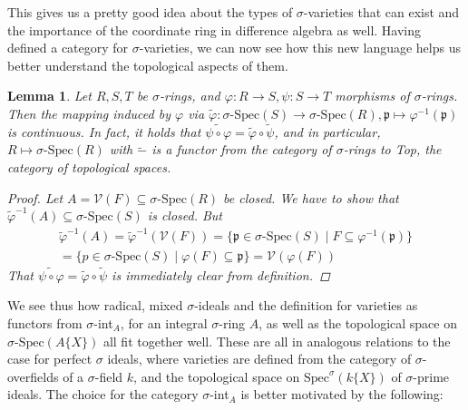 \documentclass{article}
\def\V{\mathcal{V}}
\def\p{\mathfrak{p}}
\def\s{\sigma}
\def\Spec{\text{Spec}}
\def\sSpec{\sigma\text{-Spec}}
\newenvironment{bew}{\begin{proof}[Proof]}{\end{proof}}
\theoremstyle{plain}
\newtheorem{lem}[Satz]{Lemma}
\theoremstyle{definition}
\begin{document}
This gives us a pretty good idea about the types of $\s$-varieties that can exist and the importance of the coordinate ring in difference algebra as well. 
Having defined a category for $\s$-varieties, we can now see how this new language helps us better understand the topological aspects of them.

\begin{lem}\label{inducedcont}
Let $R,S,T$ be $\s$-rings, and $\varphi: R \rightarrow S, \psi: S \rightarrow T$ morphisms of $\s$-rings. Then the mapping induced by $\varphi$ via $\tilde \varphi: \sSpec(S) \rightarrow \sSpec(R), \p \mapsto \varphi^{-1}(\p)$ is continuous. 
In fact, it holds that $\widetilde{ \psi \circ \varphi} = \tilde \varphi \circ \tilde \psi$, and in particular, $R \mapsto \sSpec(R)$ with $\tilde -$ is a functor from the category of $\s$-rings to Top, the category of topological spaces.
\begin{bew}
Let $A = \V(F) \subseteq \sSpec(R)$ be closed. We have to show that $\tilde \varphi^{-1}(A) \subseteq \sSpec(S)$ is closed.
But 
\begin{align*} \tilde \varphi^{-1}(A) = \tilde \varphi^{-1}(\V(F)) = \{ \p \in \sSpec(S) \mid F \subseteq \varphi^{-1}(\p) \} \\ = \{p \in \sSpec(S) \mid \varphi(F) \subseteq \p \} = \V(\varphi(F)) \end{align*}
That $\widetilde{ \psi \circ \varphi} = \tilde \varphi \circ \tilde \psi$ is immediately clear from definition.
\end{bew}
\end{lem}

We see thus how radical, mixed $\s$-ideals and the definition for varieties as functors from $\s$-int$_A$, for an integral $\s$-ring $A$, as well as the topological space on $\sSpec(A\{X\})$ all fit together well. 
These are all in analogous relations to the case for perfect $\s$ ideals, where varieties are defined from the category of $\s$-overfields of a $\s$-field $k$, and the topological space on $\Spec^\s(k\{X\})$ of $\s$-prime ideals.
The choice for the category $\s$-int$_A$ is better motivated by the following:
\end{document}
